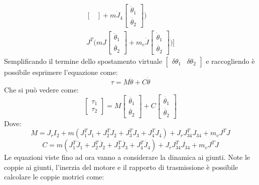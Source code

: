\begin{equation*}
\begin{split}
\begin{bmatrix}
\end{bmatrix}+m\dot{J}_4 \begin{bmatrix}
\dot{\theta}_1 \\ \dot{\theta_2}
\end{bmatrix} \bigg) \\ J^T \bigg( mJ\begin{bmatrix}
\ddot{\theta}_1 \\ \ddot{\theta_2}
\end{bmatrix}+m_e\dot{J} \begin{bmatrix}
\dot{\theta}_1 \\ \dot{\theta_2}
\end{bmatrix} \bigg)\Bigg]
\end{split} 
\end{equation*}
Semplificando il termine dello spostamento virtuale $\begin{bmatrix}
	\delta \theta_1 & \delta \theta_2
\end{bmatrix}$ e raccogliendo è possibile esprimere l'equazione come:
\begin{equation}
    \tau = M \ddot{\theta} + C \dot{\theta}
    \label{eq:dinamicaInv}
\end{equation}
Che si può vedere come:
\begin{equation}
    \begin{bmatrix}
    \tau_1 \\ \tau_2
    \end{bmatrix} = 
    M\begin{bmatrix}
    \ddot{\theta_1} \\ \ddot{\theta_2}
    \end{bmatrix}
    + C \begin{bmatrix}
    \dot{\theta_1} \\ \dot{\theta_2}
    \end{bmatrix}
\end{equation}
Dove:
\begin{equation}
    M = J_r I_2 + m(J_1^T J_1 + J_2^TJ_2+J_3^TJ_3+J_4^TJ_4)+J_rJ_{34}^TJ_{34} + m_vJ^TJ
    \label{eq:M}
\end{equation}
\begin{equation}
    C = m(J_1^T\dot{J_1}+J_2^T\dot{J_2}+J_3^T\dot{J_3}+J_4^T\dot{J_4})+J_rJ_{34}^T\dot{J_{34}}+m_vJ^T\dot{J}
    \label{eq:K}
\end{equation}
Le equazioni viste fino ad ora vanno a considerare la dinamica ai giunti. Note le coppie ai giunti, l'inerzia del motore e il rapporto di trasmissione è possibile calcolare le coppie motrici come:
